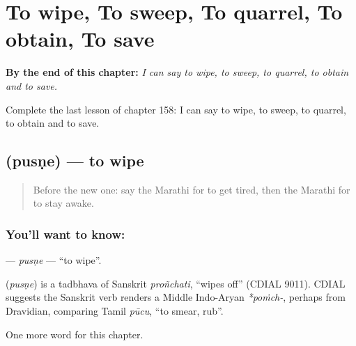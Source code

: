 
\chapter{To wipe, To sweep, To quarrel, To obtain, To save}
\label{ch:mr-to-wipe-to-sweep-to-quarrel-to-obtain-to-save}

\begin{chapteropening}
\textbf{By the end of this chapter:} \emph{I can say to wipe, to sweep, to quarrel, to obtain and to save.}

Complete the last lesson of chapter 158: I can say to wipe, to sweep, to quarrel, to obtain and to save.
\end{chapteropening}

\section[\texorpdfstring{\mr{पुसणे} (pusṇe)}{पुसणे (pusṇe)}]{ (pusṇe) — to wipe}

\label{lesson:MR-C158-pusne}



\begin{quote}
Before the new one: say the Marathi for to get tired, then the Marathi for to stay awake.
\end{quote}

\subsection*{You'll want to know: }
\textbf{} — \emph{pusṇe} — \textquotedblleft{}to wipe\textquotedblright{}.

\begin{cousinweb}
\textbf{} (\emph{pusṇe}) is a tadbhava of Sanskrit \emph{proñchati}, \textquotedblleft{}wipes off\textquotedblright{} (CDIAL 9011). CDIAL suggests the Sanskrit verb renders a Middle Indo-Aryan \emph{*poṁch-}, perhaps from Dravidian, comparing Tamil \emph{pūcu}, \textquotedblleft{}to smear, rub\textquotedblright{}.
\end{cousinweb}

\begin{grammarlens}[title={What you've built}]
One more word for this chapter.
\end{grammarlens}

